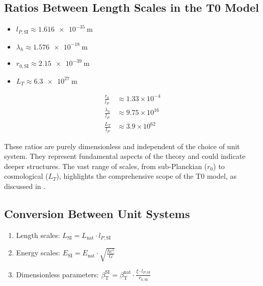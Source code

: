 \documentclass[12pt,a4paper]{article}
\newcommand{\betaT}{\beta_{\text{T}}}
\begin{document}
	\subsection{Ratios Between Length Scales in the T0 Model}
	\label{subsec:ratios_length}
	
	\begin{itemize}
		\item \(l_{P,\text{SI}} \approx \SI{1.616e-35}{\meter}\)
		\item \(\lambda_h \approx \SI{1.576e-18}{\meter}\)
		\item \(r_{0,\text{SI}} \approx \SI{2.15e-39}{\meter}\)
		\item \(L_T \approx \SI{6.3e27}{\meter}\)
	\end{itemize}
	\begin{align}
		\frac{r_0}{l_P} &\approx 1.33 \times 10^{-4} \\
		\frac{\lambda_h}{l_P} &\approx 9.75 \times 10^{16} \\
		\frac{L_T}{l_P} &\approx 3.9 \times 10^{62}
	\end{align}
	
	These ratios are purely dimensionless and independent of the choice of unit system. They represent fundamental aspects of the theory and could indicate deeper structures. The vast range of scales, from sub-Planckian (\(r_0\)) to cosmological (\(L_T\)), highlights the comprehensive scope of the T0 model, as discussed in \cite{pascher_planck_2025}.
	
	\subsection{Conversion Between Unit Systems}
	\label{subsec:conversion_scheme}
	
	\begin{tcolorbox}[colback=blue!5!white, colframe=blue!75!black, title=Conversion Scheme]
		\begin{enumerate}
			\item Length scales: \(L_{\text{SI}} = L_{\text{nat}} \cdot l_{P,\text{SI}}\)
			\item Energy scales: \(E_{\text{SI}} = E_{\text{nat}} \cdot \sqrt{\frac{\hbar c^5}{G}}\)
			\item Dimensionless parameters: \(\betaT^{\text{SI}} = \betaT^{\text{nat}} \cdot \frac{\xi \cdot l_{P,\text{SI}}}{r_{0,\text{SI}}}\)
		\end{enumerate}
	\end{tcolorbox}
	
\end{document}
